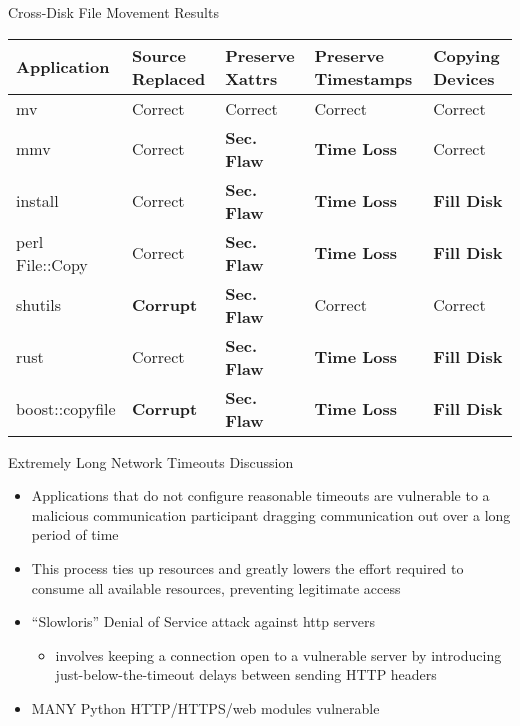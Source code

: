 \documentclass[pdf]{beamer}
\begin{document}
\begin{frame}{Cross-Disk File Movement Results}
  \tiny{}
    \begin{tabular}{l p{1cm} p{1cm} p{1.2cm} p{1cm}}
        Application     & Source Replaced & Preserve Xattrs & Preserve Timestamps & Copying Devices\\
\hline
        mv              & Correct             & Correct         & Correct             & Correct\\
        mmv             & Correct             & {\bf Sec. Flaw} & {\bf Time
Loss} & Correct\\
        install         & Correct             & {\bf Sec. Flaw} & {\bf Time
Loss} & {\bf Fill Disk} \\
        perl File::Copy & Correct             & {\bf Sec. Flaw} & {\bf Time
Loss} & {\bf Fill Disk} \\
        shutils         & {\bf Corrupt}	& {\bf Sec. Flaw} 	& Correct             & Correct\\
        rust            & Correct             & {\bf Sec. Flaw} & {\bf Time
Loss} & {\bf Fill Disk} \\
        boost::copyfile & {\bf Corrupt}	      & {\bf Sec. Flaw} & {\bf Time
Loss} & {\bf Fill Disk} \\
    \end{tabular}
\end{frame}


\begin{frame}{Extremely Long Network Timeouts Discussion}
  \begin{itemize}
  \item{Applications that do not configure reasonable timeouts are vulnerable
      to a malicious communication participant dragging communication out over a
      long period of time}
  \item{This process ties up resources and greatly lowers the effort required to
      consume all available resources, preventing legitimate access}
  \item{``Slowloris'' Denial of Service attack against http servers}
    \begin{itemize}
    \item{involves keeping a connection open to a vulnerable server by
        introducing just-below-the-timeout delays between sending HTTP headers}
        \end{itemize}
  \item{MANY Python HTTP/HTTPS/web modules vulnerable}
  \end{itemize}
\end{frame}
\end{document}
